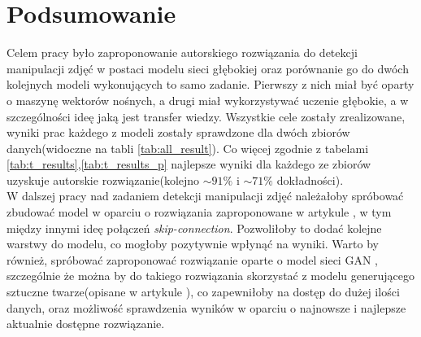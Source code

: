 \chapter{Podsumowanie}

Celem pracy było zaproponowanie autorskiego rozwiązania do detekcji manipulacji zdjęć w postaci modelu sieci głębokiej oraz porównanie go do dwóch kolejnych modeli wykonujących to samo zadanie. Pierwszy z nich miał być oparty o maszynę wektorów nośnych, a drugi miał wykorzystywać uczenie głębokie, a w szczególności ideę jaką jest transfer wiedzy. Wszystkie cele zostały zrealizowane, wyniki prac każdego z modeli zostały sprawdzone dla dwóch zbiorów danych(widoczne na tabli \ref{tab:all_result}). Co więcej zgodnie z tabelami \ref{tab:t_results},\ref{tab:t_results_p} najlepsze wyniki dla każdego ze zbiorów uzyskuje autorskie rozwiązanie(kolejno $\sim91\%$ i $\sim71\%$ dokładności). \\

W dalszej pracy nad zadaniem detekcji manipulacji zdjęć należałoby spróbować zbudować model w oparciu o rozwiązania zaproponowane w artykule \cite{resnet}, w tym między innymi ideę połączeń \textit{skip-connection}. Pozwoliłoby to dodać kolejne warstwy do modelu, co mogłoby pozytywnie wpłynąć na wyniki. Warto by również, spróbować zaproponować rozwiązanie oparte o model sieci GAN \cite{orggan}, szczególnie że można by do takiego rozwiązania skorzystać z modelu generującego sztuczne twarze(opisane w artykule \cite{gan}), co zapewniłoby na dostęp do dużej ilości danych, oraz możliwość sprawdzenia wyników w oparciu o najnowsze i najlepsze aktualnie dostępne rozwiązanie.

